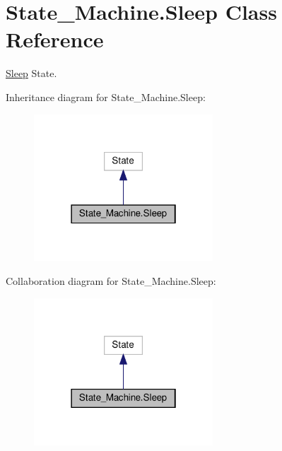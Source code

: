 \hypertarget{classState__Machine_1_1Sleep}{}\section{State\+\_\+\+Machine.\+Sleep Class Reference}
\label{classState__Machine_1_1Sleep}


\hyperlink{classState__Machine_1_1Sleep}{Sleep} State.  




Inheritance diagram for State\+\_\+\+Machine.\+Sleep\+:
\nopagebreak
\begin{figure}[H]
\begin{center}
\leavevmode
\includegraphics[width=190pt]{classState__Machine_1_1Sleep__inherit__graph}
\end{center}
\end{figure}


Collaboration diagram for State\+\_\+\+Machine.\+Sleep\+:
\nopagebreak
\begin{figure}[H]
\begin{center}
\leavevmode
\includegraphics[width=190pt]{classState__Machine_1_1Sleep__coll__graph}
\end{center}
\end{figure}
